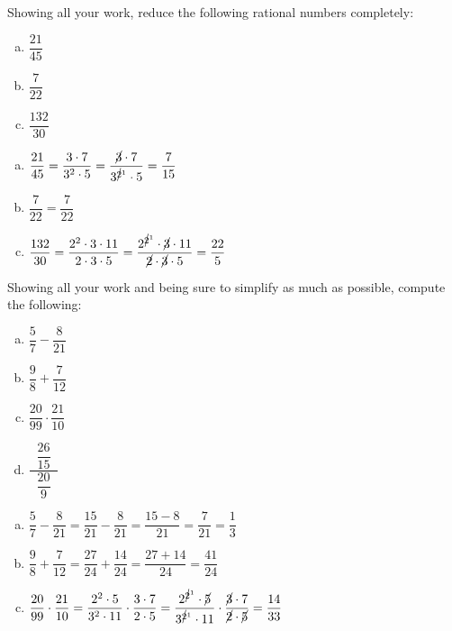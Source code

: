 \documentclass[12pt,letterpaper]{exam}
\begin{document}
\begin{questions}
\newpage
\question[10] Showing all your work, reduce the following rational numbers completely:
	\begin{enumerate}[(a)]
	\item $\dfrac{21}{45}$
	\item $\dfrac{7}{22}$
	\item $\dfrac{132}{30}$
	\end{enumerate} \pspace

\sol
\begin{enumerate}[(a)]
\item $\dfrac{21}{45}= \dfrac{3 \cdot 7}{3^2 \cdot 5}= \dfrac{\cancel{3} \cdot 7}{3^{\cancel{2}^1} \cdot 5}= \dfrac{7}{15}$ \pspace

\item $\dfrac{7}{22}= \dfrac{7}{22}$ \pspace

\item $\dfrac{132}{30}= \dfrac{2^2 \cdot 3 \cdot 11}{2 \cdot 3 \cdot 5}= \dfrac{2^{\cancel{2}^1} \cdot \cancel{3} \cdot 11}{\cancel{2} \cdot \cancel{3} \cdot 5}= \dfrac{22}{5}$
\end{enumerate}



\newpage
\question[10] Showing all your work and being sure to simplify as much as possible, compute the following:
	\begin{enumerate}[(a)] \itemsep=0.3cm
	\item $\dfrac{5}{7} - \dfrac{8}{21}$
	\item $\dfrac{9}{8} + \dfrac{7}{12}$
	\item $\dfrac{20}{99} \cdot \dfrac{21}{10}$
	\item $\dfrac{\;\;\dfrac{26}{15}\;\;}{\;\;\dfrac{20}{9}\;\;}$
	\end{enumerate} \pspace

\sol
\begin{enumerate}[(a)]
\item $\dfrac{5}{7} - \dfrac{8}{21}= \dfrac{15}{21} - \dfrac{8}{21}= \dfrac{15 - 8}{21}= \dfrac{7}{21}= \dfrac{1}{3}$ \pspace

\item $\dfrac{9}{8} + \dfrac{7}{12}= \dfrac{27}{24} + \dfrac{14}{24}= \dfrac{27 + 14}{24}= \dfrac{41}{24}$ \pspace

\item $\dfrac{20}{99} \cdot \dfrac{21}{10}= \dfrac{2^2 \cdot 5}{3^2 \cdot 11} \cdot \dfrac{3 \cdot 7}{2 \cdot 5}= \dfrac{2^{\cancel{2}^1} \cdot \cancel{5}}{3^{\cancel{2}^1} \cdot 11} \cdot \dfrac{\cancel{3} \cdot 7}{\cancel{2} \cdot \cancel{5}}= \dfrac{14}{33}$ \pspace


\end{enumerate}
\end{questions}
\end{document}
